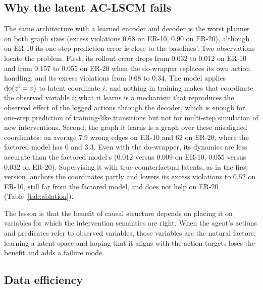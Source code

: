 \subsection{Why the latent AC-LSCM fails}
\label{sec:latent}

The same architecture with a learned encoder and decoder is the worst planner
on both graph sizes (excess violations $0.68$ on ER-10, $0.90$ on ER-20),
although on ER-10 its one-step prediction error is close to the baselines'. Two
observations locate the problem. First, its rollout error drops from $0.032$
to $0.012$ on ER-10 and from $0.157$ to $0.055$ on ER-20 when the do-wrapper
replaces its own action handling, and its excess violations from $0.68$ to
$0.34$. The model applies $\mathrm{do}(z^i = v)$ to latent coordinate $i$, and
nothing in training makes that coordinate the observed variable $i$; what it
learns is a mechanism that reproduces the observed effect of the logged
actions through the decoder, which is enough for one-step prediction of
training-like transitions but not for multi-step simulation of new
interventions. Second, the graph it learns is a graph over these misaligned
coordinates: on average $7.9$ wrong edges on ER-10 and $62$ on ER-20, where the
factored model has $0$ and $3.3$. Even with the do-wrapper, its dynamics are
less accurate than the factored model's ($0.012$ versus $0.009$ on ER-10,
$0.055$ versus $0.032$ on ER-20). Supervising it with true counterfactual
latents, as in the first version, anchors the coordinates partly and lowers
its excess violations to $0.52$ on ER-10, still far from the factored
model, and does not help on ER-20 (Table~\ref{tab:ablation}).

The lesson is that the benefit of causal structure depends on placing it on
variables for which the intervention semantics are right. When the agent's
actions and predicates refer to observed variables, those variables are the
natural factors; learning a latent space and hoping that it aligns with the
action targets loses the benefit and adds a failure mode.

\subsection{Data efficiency}
\label{sec:data}

